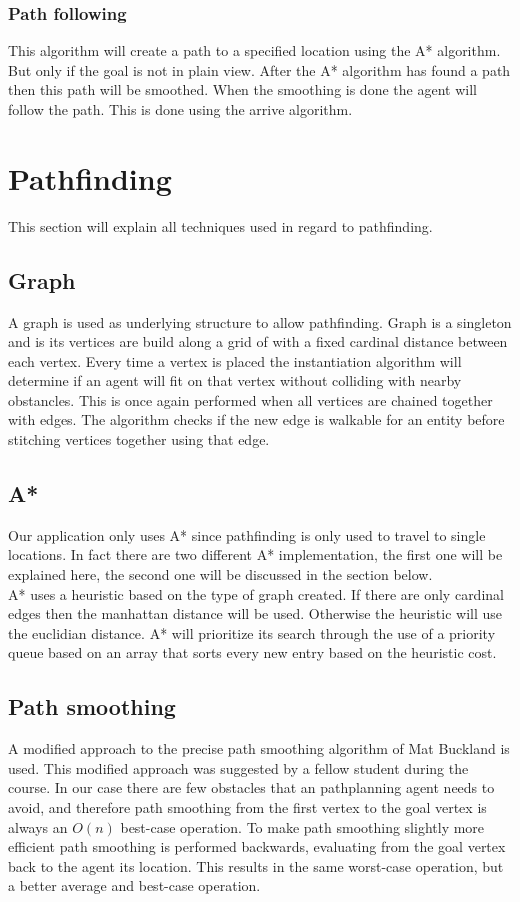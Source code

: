 \documentclass[10pt]{extarticle} %
\begin{document}
  \subsubsection {Path following}
   This algorithm will create a path to a specified location using the A* algorithm. But only if the goal is not in plain view. After the A* algorithm has found a path then this path will be smoothed. When the smoothing is done the agent will follow the path. This is done using the arrive algorithm. 
   \newpage
   
   \section {Pathfinding}
This section will explain all techniques used in regard to pathfinding.
   \subsection {Graph}
  A graph is used as underlying structure to allow pathfinding. Graph is a singleton and is its vertices are build along a grid of with a fixed cardinal distance between each vertex. Every time a vertex is placed the instantiation algorithm will determine if an agent will fit on that vertex without colliding with nearby obstancles. This is once again performed when all vertices are chained together with edges. The algorithm checks if the new edge is walkable for an entity before stitching vertices together using that edge.
   \subsection {A*}
  Our application only uses A* since pathfinding is only used to travel to single locations. In fact there are two different A* implementation, the first one will be explained here, the second one will be discussed in the section below. \\
  A* uses a heuristic based on the type of graph created. If there are only cardinal edges then the manhattan distance will be used. Otherwise the heuristic will use the euclidian distance. A* will prioritize its search through the use of a priority queue based on an array that sorts every new entry based on the heuristic cost. 
   \subsection {Path smoothing}
A modified approach to the precise path smoothing algorithm of Mat Buckland \cite{pgaie} is used. This modified approach was suggested by a fellow student during the course. In our case there are few obstacles that an pathplanning agent needs to avoid, and therefore path smoothing from the first vertex to the goal vertex is always an \(O(n)\) best-case operation. To make path smoothing slightly more efficient path smoothing is performed backwards, evaluating from the goal vertex back to the agent its location. This results in the same worst-case operation, but a better average and best-case operation.
\end{document}
